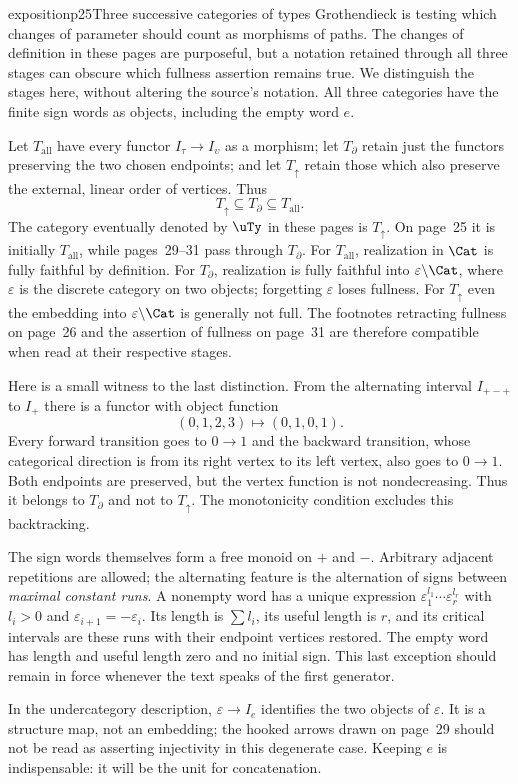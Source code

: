 \begin{dcomment}{exposition}{p25}{Three successive categories of types}
Grothendieck is testing which changes of parameter should count as morphisms of paths. The changes of definition in these pages are purposeful, but a notation retained through all three stages can obscure which fullness assertion remains true. We distinguish the stages here, without altering the source's notation. All three categories have the finite sign words as objects, including the empty word $e$.

Let $T_{\mathrm{all}}$ have every functor $I_\tau\to I_\upsilon$ as a morphism; let $T_{\partial}$ retain just the functors preserving the two chosen endpoints; and let $T_{\uparrow}$ retain those which also preserve the external, linear order of vertices. Thus
\[
 T_{\uparrow}\subseteq T_{\partial}\subseteq T_{\mathrm{all}}.
\]
The category eventually denoted by $\uTy$ in these pages is $T_{\uparrow}$. On page~25 it is initially $T_{\mathrm{all}}$, while pages~29--31 pass through $T_{\partial}$. For $T_{\mathrm{all}}$, realization in $\Cat$ is fully faithful by definition. For $T_{\partial}$, realization is fully faithful into $\varepsilon\backslash\Cat$, where $\varepsilon$ is the discrete category on two objects; forgetting $\varepsilon$ loses fullness. For $T_{\uparrow}$ even the embedding into $\varepsilon\backslash\Cat$ is generally not full. The footnotes retracting fullness on page~26 and the assertion of fullness on page~31 are therefore compatible when read at their respective stages.

Here is a small witness to the last distinction. From the alternating interval $I_{+-+}$ to $I_+$ there is a functor with object function
\[
 (0,1,2,3)\longmapsto(0,1,0,1).
\]
Every forward transition goes to $0\to1$ and the backward transition, whose categorical direction is from its right vertex to its left vertex, also goes to $0\to1$. Both endpoints are preserved, but the vertex function is not nondecreasing. Thus it belongs to $T_{\partial}$ and not to $T_{\uparrow}$. The monotonicity condition excludes this backtracking.

The sign words themselves form a free monoid on $+$ and $-$. Arbitrary adjacent repetitions are allowed; the alternating feature is the alternation of signs between \emph{maximal constant runs}. A nonempty word has a unique expression $\varepsilon_1^{l_1}\cdots\varepsilon_r^{l_r}$ with $l_i>0$ and $\varepsilon_{i+1}=-\varepsilon_i$. Its length is $\sum l_i$, its useful length is $r$, and its critical intervals are these runs with their endpoint vertices restored. The empty word has length and useful length zero and no initial sign. This last exception should remain in force whenever the text speaks of the first generator.

In the undercategory description, $\varepsilon\to I_e$ identifies the two objects of $\varepsilon$. It is a structure map, not an embedding; the hooked arrows drawn on page~29 should not be read as asserting injectivity in this degenerate case. Keeping $e$ is indispensable: it will be the unit for concatenation.
\end{dcomment}

